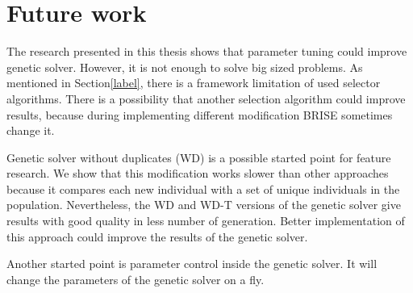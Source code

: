 \chapter{Future work}

The research presented in this thesis shows that parameter tuning could improve genetic solver. However, it is not enough to solve big sized problems. As mentioned in Section\ref{label}, there is a framework limitation of used selector algorithms. There is a possibility that another selection algorithm could improve results, because during implementing different modification BRISE sometimes change it.

Genetic solver without duplicates (WD) is a possible started point for feature research. We show that this modification works slower than other approaches because it compares each new individual with a set of unique individuals in the population. Nevertheless, the WD and WD-T versions of the genetic solver give results with good quality in less number of generation. Better implementation of this approach could improve the results of the genetic solver.

Another started point is parameter control inside the genetic solver. It will change the parameters of the genetic solver on a fly. 